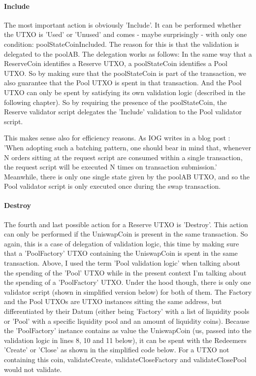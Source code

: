 \documentclass[a4paper,twoside,12pt]{report}
\begin{document}
\paragraph{Include}

The most important action is obviously 'Include'. It can be performed whether the UTXO is 'Used' or 'Unused' and comes - maybe surprisingly - with only one condition: poolStateCoinIncluded. The reason for this is that the validation is delegated to the poolAB. The delegation works as follows: In the same way that a ReserveCoin identifies a Reserve UTXO, a poolStateCoin identifies a Pool UTXO. So by making sure that the poolStateCoin is part of the transaction, we also guarantee that the Pool UTXO is spent in that transaction. And the Pool UTXO can only be spent by satisfying its own validation logic (described in the following chapter). So by requiring the presence of the poolStateCoin, the Reserve validator script delegates the 'Include' validation to the Pool validator script.

This makes sense also for efficiency reasons. As IOG writes in a blog post \cite{iogDesignPattern}: 'When adopting such a batching pattern, one should bear in mind that, whenever N orders sitting at the request script are consumed within a single transaction, the request script will be executed N times on transaction submission.' Meanwhile, there is only one single state given by the poolAB UTXO, and so the Pool validator script is only executed once during the swap transaction.

\paragraph{Destroy}

The fourth and last possible action for a Reserve UTXO is 'Destroy'. This action can only be performed if the UniswapCoin is present in the same transaction. So again, this is a case of delegation of validation logic, this time by making sure that a 'PoolFactory' UTXO containing the UniswapCoin is spent in the same transaction.
Above, I used the term 'Pool validation logic' when talking about the spending of the 'Pool' UTXO while in the present context I'm talking about the spending of a 'PoolFactory' UTXO. 
Under the hood though, there is only one validator script (shown in simplified version below) for both of them. The Factory and the Pool UTXOs are UTXO instances sitting the same address, but differentiated by their Datum (either being 'Factory' with a list of liquidity pools or 'Pool' with a specific liquidity pool and an amount of liquidity coins). Because the 'PoolFactory' instance contains as value the UniswapCoin (us, passed into the validation logic in lines 8, 10 and 11 below), it can be spent with the Redeemers 'Create' or 'Close' as shown in the simplified code below. For a UTXO not containing this coin, validateCreate, validateCloseFactory and validateClosePool would not validate. 
\end{document}
